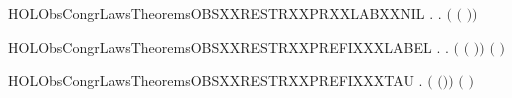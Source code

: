 \newcommand{\HOLObsCongrLawsTheoremsOBSXXRESTRXXNIL}{\UseVerbatim{HOLObsCongrLawsTheoremsOBSXXRESTRXXNIL}}
\begin{SaveVerbatim}{HOLObsCongrLawsTheoremsOBSXXRESTRXXPRXXLABXXNIL}
\HOLTokenTurnstile{} \HOLSymConst{\HOLTokenForall{}} .
        \HOLConst{\HOLTokenIn{}}  \HOLSymConst{\HOLTokenDisj{}}   \HOLConst{\HOLTokenIn{}}  \HOLSymConst{\HOLTokenImp{}} \HOLSymConst{\HOLTokenForall{}}.  \ensuremath{(}  \ensuremath{(} \HOLSymConst{\ensuremath{\ldotp}}\ensuremath{)}\ensuremath{)} 
\end{SaveVerbatim}
\newcommand{\HOLObsCongrLawsTheoremsOBSXXRESTRXXPRXXLABXXNIL}{\UseVerbatim{HOLObsCongrLawsTheoremsOBSXXRESTRXXPRXXLABXXNIL}}
\begin{SaveVerbatim}{HOLObsCongrLawsTheoremsOBSXXRESTRXXPREFIXXXLABEL}
\HOLTokenTurnstile{} \HOLSymConst{\HOLTokenForall{}} .
        \HOLConst{\HOLTokenNotIn{}}  \HOLSymConst{\HOLTokenConj{}}   \HOLConst{\HOLTokenNotIn{}}  \HOLSymConst{\HOLTokenImp{}}
       \HOLSymConst{\HOLTokenForall{}}.  \ensuremath{(}  \ensuremath{(} \HOLSymConst{\ensuremath{\ldotp}}\ensuremath{)}\ensuremath{)} \ensuremath{(} \HOLSymConst{\ensuremath{\ldotp}}  \ensuremath{)}
\end{SaveVerbatim}
\newcommand{\HOLObsCongrLawsTheoremsOBSXXRESTRXXPREFIXXXLABEL}{\UseVerbatim{HOLObsCongrLawsTheoremsOBSXXRESTRXXPREFIXXXLABEL}}
\begin{SaveVerbatim}{HOLObsCongrLawsTheoremsOBSXXRESTRXXPREFIXXXTAU}
\HOLTokenTurnstile{} \HOLSymConst{\HOLTokenForall{}} .  \ensuremath{(}  \ensuremath{(}\HOLConst{\ensuremath{\tau}}\HOLSymConst{\ensuremath{\ldotp}}\ensuremath{)}\ensuremath{)} \ensuremath{(}\HOLConst{\ensuremath{\tau}}\HOLSymConst{\ensuremath{\ldotp}}  \ensuremath{)}
\end{SaveVerbatim}
\newcommand{\HOLObsCongrLawsTheoremsOBSXXRESTRXXPREFIXXXTAU}{\UseVerbatim{HOLObsCongrLawsTheoremsOBSXXRESTRXXPREFIXXXTAU}}
